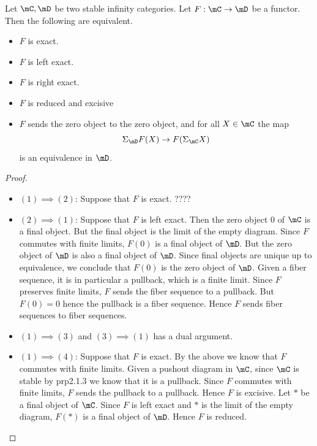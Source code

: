 \documentclass[a4paper]{article}
\begin{document}
\begin{prp}{}{} Let $\mC,\mD$ be two stable infinity categories. Let $F:\mC\to\mD$ be a functor. Then the following are equivalent. 
\begin{itemize}
\item $F$ is exact. 
\item $F$ is left exact. 
\item $F$ is right exact. 
\item $F$ is reduced and excisive
\item $F$ sends the zero object to the zero object, and for all $X\in\mC$ the map $$\Sigma_\mD F(X)\to F(\Sigma_\mC X)$$ is an equivalence in $\mD$. 
\end{itemize}
\begin{proof}~\\
\begin{itemize}
\item $(1)\implies (2)$: Suppose that $F$ is exact. ????\\

\item $(2)\implies (1)$: Suppose that $F$ is left exact. Then the zero object $0$ of $\mC$ is a final object. But the final object is the limit of the empty diagram. Since $F$ commutes with finite limits, $F(0)$ is a final object of $\mD$. But the zero object of $\mD$ is also a final object of $\mD$. Since final objects are unique up to equivalence, we conclude that $F(0)$ is the zero object of $\mD$. Given a fiber sequence, it is in particular a pullback, which is a finite limit. Since $F$ preserves finite limits, $F$ sends the fiber sequence to a pullback. But $F(0)=0$ hence the pullback is a fiber sequence. Hence $F$ sends fiber sequences to fiber sequences. \\

\item $(1)\implies (3)$ and $(3)\implies (1)$ has a dual argument. \\

\item $(1)\implies (4)$: Suppose that $F$ is exact. By the above we know that $F$ commutes with finite limits. Given a pushout diagram in $\mC$, since $\mC$ is stable by prp2.1.3 we know that it is a pullback. Since $F$ commutes with finite limits, $F$ sends the pullback to a pullback. Hence $F$ is excisive. Let $\ast$ be a final object of $\mC$. Since $F$ is left exact and $\ast$ is the limit of the empty diagram, $F(\ast)$ is a final object of $\mD$. Hence $F$ is reduced. \\


\end{itemize}
\end{proof}
\end{prp}
\end{document}
